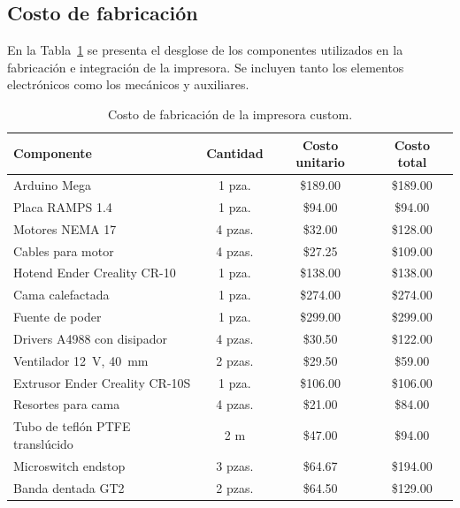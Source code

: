 \subsection{Costo de fabricación}
En la Tabla~\ref{tab:costo_fabricacion} se presenta el desglose de los componentes utilizados en la fabricación e integración de la impresora. Se incluyen tanto los elementos electrónicos como los mecánicos y auxiliares.

\begin{table}[H]
    \centering
    \small
    \caption{Costo de fabricación de la impresora custom.}
    \label{tab:costo_fabricacion}
    \begin{tabular}{lccc}
        \toprule
        \textbf{Componente} & \textbf{Cantidad} & \textbf{Costo unitario} & \textbf{Costo total} \\
        \midrule
        Arduino Mega                    & 1 pza.            & \$189.00 & \$189.00 \\
        Placa RAMPS 1.4                 & 1 pza.            & \$94.00  & \$94.00  \\
        Motores NEMA 17                 & 4 pzas.           & \$32.00  & \$128.00 \\
        Cables para motor               & 4 pzas.           & \$27.25  & \$109.00 \\
        Hotend Ender Creality CR-10     & 1 pza.            & \$138.00 & \$138.00 \\
        Cama calefactada                   & 1 pza.            & \$274.00 & \$274.00 \\
        Fuente de poder                 & 1 pza.            & \$299.00 & \$299.00 \\
        Drivers A4988 con disipador     & 4 pzas.           & \$30.50  & \$122.00 \\
        Ventilador \qty{12}{\V}, \qty{40}{\mm} & 2 pzas.   & \$29.50  & \$59.00  \\
        Extrusor Ender Creality CR-10S  & 1 pza.            & \$106.00 & \$106.00 \\
        Resortes para cama              & 4 pzas.           & \$21.00  & \$84.00  \\
        Tubo de teflón PTFE translúcido & 2 m               & \$47.00  & \$94.00  \\
        Microswitch endstop             & 3 pzas.           & \$64.67  & \$194.00 \\
        Banda dentada GT2               & 2 pzas.           & \$64.50  & \$129.00 \\

\end{tabular}
\end{table}

